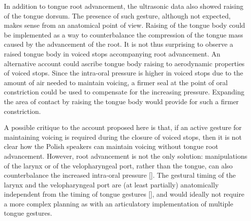 \documentclass[authoryear, twocolumn]{elsarticle}
\begin{document}
In addition to tongue root advancement, the ultrasonic data also showed
raising of the tongue dorsum. The presence of such gesture, although not
expected, makes sense from an anatomical point of view. Raising of the
tongue body could be implemented as a way to counterbalance the
compression of the tongue mass caused by the advancement of the root. It
is not thus surprising to observe a raised tongue body in voiced stops
accompanying root advancement. An alternative account could ascribe
tongue body raising to aerodynamic properties of voiced stops. Since the
intra-oral pressure is higher in voiced stops due to the amount of air
needed to maintain voicing, a firmer seal at the point of oral
constriction could be used to compensate for the increasing pressure.
Expanding the area of contact by raising the tongue body would provide
for such a firmer constriction.

A possible critique to the account proposed here is that, if an active
gesture for maintaining voicing is required during the closure of voiced
stops, then it is not clear how the Polish speakers can maintain voicing
without tongue root advancement. However, root advancement is not the
only solution: manipulations of the larynx or of the velopharyngeal
port, rather than the tongue, can also counterbalance the increased
intra-oral pressure {[}{]}. The gestural timing of the larynx and the
velopharyngeal port are (at least partially) anatomically independent
from the timing of tongue gestures {[}{]}, and would ideally not require
a more complex planning as with an articulatory implementation of
multiple tongue gestures.


\end{document}
